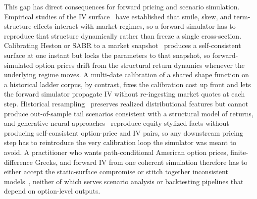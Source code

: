 This gap has direct consequences for forward pricing and scenario simulation. Empirical studies of the IV surface~\cite{cont2002} have established that smile, skew, and term-structure effects interact with market regimes, so a forward simulator has to reproduce that structure dynamically rather than freeze a single cross-section. Calibrating Heston or SABR to a market snapshot~\cite{hagan2002,gatheral2004} produces a self-consistent surface at one instant but locks the parameters to that snapshot, so forward-simulated option prices drift from the structural return dynamics whenever the underlying regime moves. A multi-date calibration of a shared shape function on a historical ladder corpus, by contrast, fixes the calibration cost up front and lets the forward simulator propagate IV without re-ingesting market quotes at each step. Historical resampling~\cite{glasserman2004} preserves realized distributional features but cannot produce out-of-sample tail scenarios consistent with a structural model of returns, and generative neural approaches~\cite{wiese2020} reproduce equity stylized facts without producing self-consistent option-price and IV pairs, so any downstream pricing step has to reintroduce the very calibration loop the simulator was meant to avoid. A practitioner who wants path-conditional American option prices, finite-difference Greeks, and forward IV from one coherent simulation therefore has to either accept the static-surface compromise or stitch together inconsistent models~\cite{buehler2019}, neither of which serves scenario analysis or backtesting pipelines that depend on option-level outputs.

